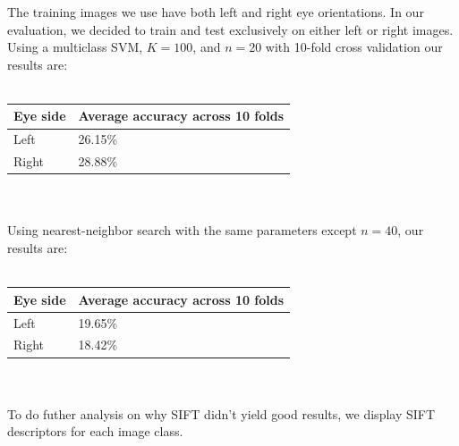 \documentclass{article} %
\begin{document}
The training images we use have both left and right eye orientations. In our evaluation, we decided to train and test exclusively on either left or right images. Using a multiclass SVM, $K=100$, and $n=20$ with 10-fold cross validation our results are: \\ \\
\begin{tabular}{| l | l |}
\hline
Eye side & Average accuracy across 10 folds \\ \hline
Left & 26.15\% \\ \hline
Right & 28.88\% \\ \hline
\end{tabular} \\ \\
Using nearest-neighbor search with the same parameters except $n=40$, our results are: \\ \\
\begin{tabular}{| l | l |}
\hline
Eye side & Average accuracy across 10 folds \\ \hline
Left & 19.65\% \\ \hline
Right & 18.42\% \\ \hline
\end{tabular}  \\ \\
To do futher analysis on why SIFT didn't yield good results, we display SIFT descriptors for each image class. 
\end{document}
